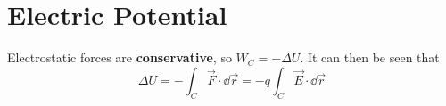 \documentclass[./Electricity and Magnetism.tex]{subfiles}
\begin{document}
	\section{Electric Potential}
		Electrostatic forces are \textbf{conservative}, so \(W_C = -\Delta U\). It can then be seen that
			\[
				\Delta U = - \int_C \vec{F} \cdot \dd{\vec{r}} 
						= -q\int_C \vec{E} \cdot \dd{\vec{r}}
			\]	
			
\end{document}
